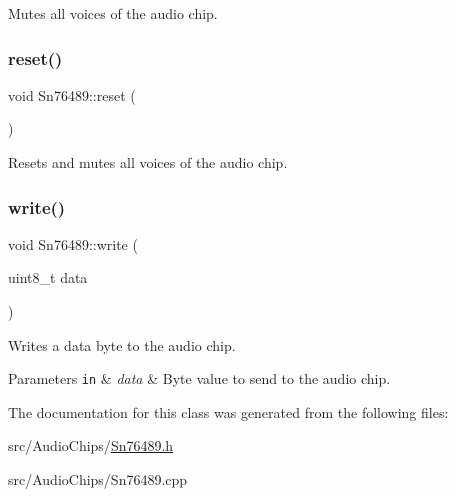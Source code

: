 Mutes all voices of the audio chip. \mbox{\label{classSn76489_a904bb7ddb48bb425181bcdae443c49fb}} 
\subsubsection{\texorpdfstring{reset()}{reset()}}
{\footnotesize\ttfamily void Sn76489\+::reset (\begin{DoxyParamCaption}{ }\end{DoxyParamCaption})}

Resets and mutes all voices of the audio chip. \mbox{\label{classSn76489_a5add4d0735cd8edbd03eb1c54bd09532}} 
\subsubsection{\texorpdfstring{write()}{write()}}
{\footnotesize\ttfamily void Sn76489\+::write (\begin{DoxyParamCaption}\item[{uint8\+\_\+t}]{data }\end{DoxyParamCaption})}

Writes a data byte to the audio chip.


\begin{DoxyParams}[1]{Parameters}
\mbox{\tt in}  & {\em data} & Byte value to send to the audio chip. \\
\hline
\end{DoxyParams}


The documentation for this class was generated from the following files\+:\begin{DoxyCompactItemize}
\item 
src/\+Audio\+Chips/\mbox{\hyperlink{Sn76489_8h}{Sn76489.\+h}}\item 
src/\+Audio\+Chips/Sn76489.\+cpp\end{DoxyCompactItemize}
